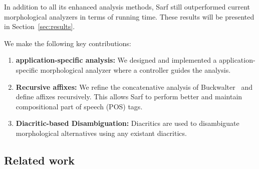 \documentclass[11pt]{article}
\begin{document}
In addition to all its enhanced analysis methods, Sarf still
outperformed current morphological analyzers in terms of running time.
These results will be presented in Section~\ref{sec:results}.

We make the following key contributions: 
\begin{enumerate}
\item {\bf application-specific analysis:}  We designed and implemented
a application-specific morphological analyzer where a controller
guides the analysis. 
\item {\bf Recursive affixes:}
We refine the concatenative analysis of 
Buckwalter~ and define affixes
recursively. 
This allows Sarf to perform better and 
maintain compositional part of speech (POS) tags.
\item {\bf Diacritic-based Disambiguation:}
Diacritics are used to disambiguate morphological
alternatives using any existant diacritics.
\end{enumerate}




\subsection{Related work }
\label{sec:related}
\end{document}
